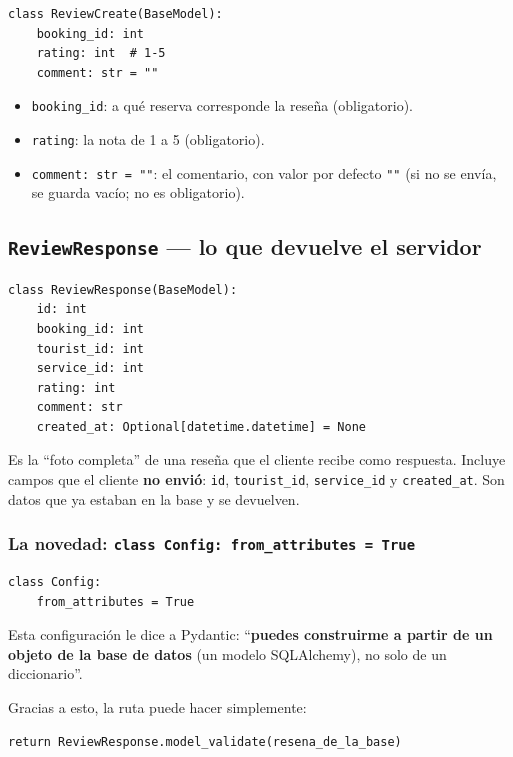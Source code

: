 \documentclass[11pt,a4paper]{article}
\begin{document}
\begin{lstlisting}
class ReviewCreate(BaseModel):
    booking_id: int
    rating: int  # 1-5
    comment: str = ""
\end{lstlisting}

\begin{itemize}
    \item \texttt{booking\_id}: a qué reserva corresponde la reseña (obligatorio).
    \item \texttt{rating}: la nota de 1 a 5 (obligatorio).
    \item \texttt{comment: str = ""}: el comentario, con valor por defecto \texttt{""} (si no
    se envía, se guarda vacío; no es obligatorio).
\end{itemize}

\subsection{\texttt{ReviewResponse} --- lo que devuelve el servidor}

\begin{lstlisting}
class ReviewResponse(BaseModel):
    id: int
    booking_id: int
    tourist_id: int
    service_id: int
    rating: int
    comment: str
    created_at: Optional[datetime.datetime] = None
\end{lstlisting}

Es la ``foto completa'' de una reseña que el cliente recibe como respuesta. Incluye campos que
el cliente \textbf{no envió}: \texttt{id}, \texttt{tourist\_id}, \texttt{service\_id} y
\texttt{created\_at}. Son datos que ya estaban en la base y se devuelven.

\subsubsection{La novedad: \texttt{class Config: from\_attributes = True}}

\begin{lstlisting}
class Config:
    from_attributes = True
\end{lstlisting}

Esta configuración le dice a Pydantic: ``\textbf{puedes construirme a partir de un objeto de
la base de datos} (un modelo SQLAlchemy), no solo de un diccionario''.

Gracias a esto, la ruta puede hacer simplemente:

\begin{lstlisting}
return ReviewResponse.model_validate(resena_de_la_base)
\end{lstlisting}
\end{document}
